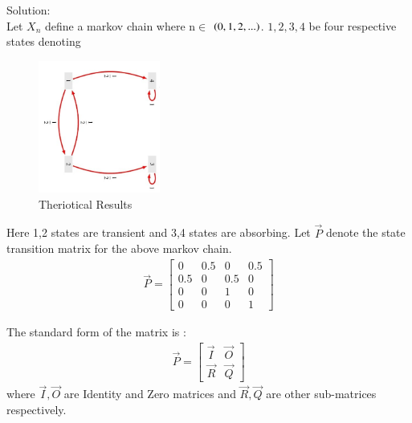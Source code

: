 \documentclass[journal,12pt,twocolumn]{IEEEtran}
\begin{document}
Solution:\\
Let $X_n$ define a markov chain where n$\in$ $\left(0,1,2,...\right)$. $1,2,3,4$ be four respective states denoting 
\begin{center}
\begin{table}[h]
    \centering
    \caption{States of the notations used in the Markov Chain}
    \label{table 1}
\end{table}
\end{center}
\begin{figure}[htp]
    \centering
    \includegraphics[width=4cm]{Theriotical Value.jpeg}
    \caption{Theriotical Results}
    \label{fig:Markov Chain}
\end{figure}
Here 1,2 states are transient and 3,4 states are absorbing. 
Let $\vec{P}$ denote the state transition matrix for the above markov chain.
\begin{align}\vec{P} =
\begin{bmatrix}
0 & 0.5 & 0 & 0.5 \\
0.5 & 0 & 0.5 & 0 \\
0 & 0 & 1 & 0 \\
0 & 0 & 0 & 1
\end{bmatrix}
\end{align}
\begin{lemma}


The standard form of the matrix is :
\begin{align}\vec{P} = 
\begin{bmatrix}
\vec{I} & \vec{O}\\
\vec{R} & \vec{Q} 
\end{bmatrix}
\end{align}
where $\vec{I},\vec{O}$ are Identity and Zero matrices and $\vec{R},\vec{Q}$ are other sub-matrices respectively.

\end{lemma}
\end{document}

